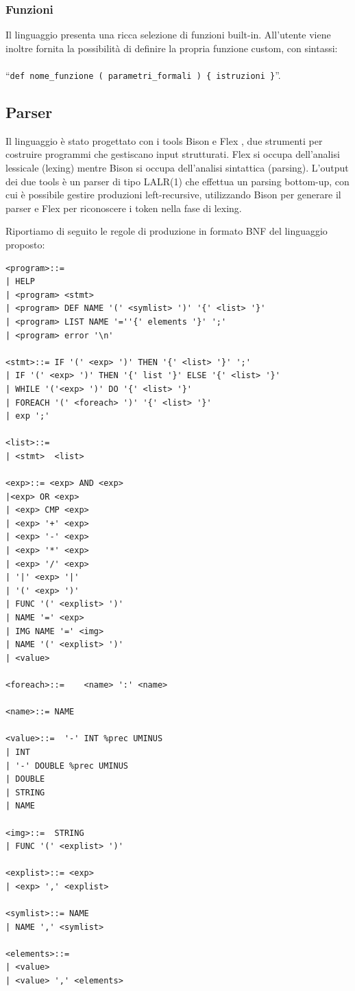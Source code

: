 \documentclass[10pt]{article}
\begin{document}
\subsubsection{Funzioni}
Il linguaggio presenta una ricca selezione di funzioni built-in. All'utente viene inoltre fornita la possibilità di definire la propria funzione custom, con sintassi:\\\\ ``\texttt{def nome\_funzione ( parametri\_formali ) \{ istruzioni \}}''.
\clearpage
\subsection{Parser}
Il linguaggio è stato progettato con i tools Bison e Flex \cite{book}, due strumenti per costruire programmi che gestiscano input strutturati. Flex si occupa dell'analisi lessicale (lexing) mentre Bison si occupa dell'analisi sintattica (parsing). L'output dei due tools è un parser di tipo LALR(1) che effettua un parsing bottom-up, con cui è possibile gestire  produzioni left-recursive, utilizzando Bison per generare il parser e Flex per riconoscere i token nella fase di lexing.

Riportiamo di seguito le regole di produzione in formato BNF del linguaggio proposto:

\begin{lstlisting}
<program>::=
| HELP
| <program> <stmt>    
| <program> DEF NAME '(' <symlist> ')' '{' <list> '}' 
| <program> LIST NAME '=''{' elements '}' ';' 
| <program> error '\n'

<stmt>::= IF '(' <exp> ')' THEN '{' <list> '}' ';'                
| IF '(' <exp> ')' THEN '{' list '}' ELSE '{' <list> '}'   
| WHILE '('<exp> ')' DO '{' <list> '}'                    
| FOREACH '(' <foreach> ')' '{' <list> '}'                 
| exp ';'

<list>::=                               
| <stmt>  <list>                    

<exp>::= <exp> AND <exp>          
|<exp> OR <exp>           
| <exp> CMP <exp>          
| <exp> '+' <exp>          
| <exp> '-' <exp>       
| <exp> '*' <exp>        
| <exp> '/' <exp>       
| '|' <exp> '|'          
| '(' <exp> ')'          
| FUNC '(' <explist> ')' 
| NAME '=' <exp>         
| IMG NAME '=' <img>     
| NAME '(' <explist> ')' 
| <value>                

<foreach>::=    <name> ':' <name>        

<name>::= NAME                       

<value>::=  '-' INT %prec UMINUS      
| INT                          
| '-' DOUBLE %prec UMINUS      
| DOUBLE                       
| STRING                       
| NAME                         

<img>::=  STRING              
| FUNC '(' <explist> ')' 

<explist>::= <exp>          
| <exp> ',' <explist>  

<symlist>::= NAME         
| NAME ',' <symlist> 

<elements>::=                
| <value>               
| <value> ',' <elements>  

\end{lstlisting}
\end{document}
